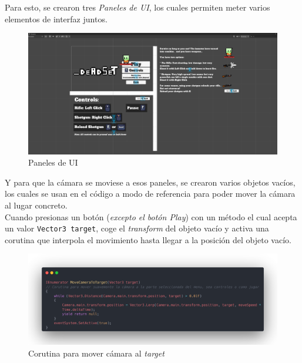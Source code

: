 \documentclass[12pt]{article}
\begin{document}
        Para esto, se crearon tres \textit{Paneles de UI}, los cuales permiten meter varios elementos de interfaz juntos.\\
        \begin{figure}[H]
            \centering
            \includegraphics[width=\textwidth]{Images/Menuprincipal/Paneles.png}
            \caption{Paneles de UI}
        \end{figure}

        Y para que la cámara se moviese a esos paneles, se crearon varios objetos vacíos, los cuales se usan en el código a modo de referencia para poder mover la cámara al lugar concreto. \\
        Cuando presionas un botón (\textit{excepto el botón Play}) con un método el cual acepta un valor \texttt{Vector3 target}, coge el \textit{transform} del objeto vacío y activa una corutina que interpola el movimiento hasta llegar a la posición del objeto vacío. \\
        \begin{figure}[H]
            \centering
            \includegraphics[width=\textwidth]{Images/Menuprincipal/corutinacamara.png}
            \caption{Corutina para mover cámara al \textit{target}}
        \end{figure}

    \newpage
\end{document}
